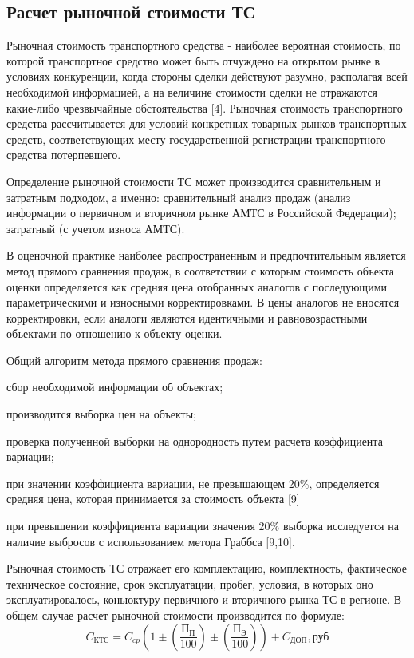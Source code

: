 \subsection{Расчет рыночной стоимости ТС}


\par \indent Рыночная стоимость транспортного средства - наиболее вероятная стоимость, по которой транспортное средство может быть отчуждено на открытом рынке в условиях конкуренции, когда стороны сделки действуют разумно, располагая всей необходимой информацией, а на величине стоимости сделки не отражаются какие-либо чрезвычайные обстоятельства [4]. Рыночная стоимость транспортного средства  рассчитывается  для условий конкретных товарных рынков транспортных средств, соответствующих месту государственной регистрации транспортного средства потерпевшего.
\par Определение рыночной стоимости ТС может производится сравнительным и затратным подходом, а именно:  сравнительный анализ продаж (анализ информации о первичном и вторичном рынке АМТС в Российской Федерации);  затратный (с учетом износа АМТС).
\par В оценочной практике наиболее распространенным и предпочтительным является метод прямого сравнения продаж, в соответствии с которым стоимость объекта оценки определяется как средняя цена отобранных аналогов с последующими параметрическими и износными корректировками.   В цены аналогов не вносятся корректировки, если аналоги являются идентичными и равновозрастными объектами по отношению к объекту оценки. 
\par Общий алгоритм метода прямого сравнения продаж:
\begin{list}{-}{}
	\item сбор необходимой информации об объектах;
	\item  производится выборка цен на объекты;
\item  проверка полученной выборки на однородность путем расчета коэффициента вариации;
\item  при значении коэффициента вариации, не превышающем 20\%, определяется средняя цена, которая принимается за стоимость объекта [9]
\item  при превышении коэффициента вариации значения  20\%  выборка исследуется на наличие выбросов с использованием метода Граббса [9,10].
\end{list}
Рыночная стоимость ТС отражает его комплектацию, комплектность, фактическое техническое состояние, срок эксплуатации, пробег, условия, в которых оно эксплуатировалось, коньюктуру первичного и вторичного рынка ТС в регионе. В общем случае расчет рыночной стоимости производится по формуле:
\begin{equation}\label{eq:aa}
C_{\text{КТС}} = C_{cp}\left(1 \pm  \left( \frac{\text{П}_{\text{П}}}{100}\right) \pm\left( \frac{\text{П}_{\text{Э}}}{100}\right) \right) + C_{\text{ДОП}}, \text{руб}
\end{equation}

